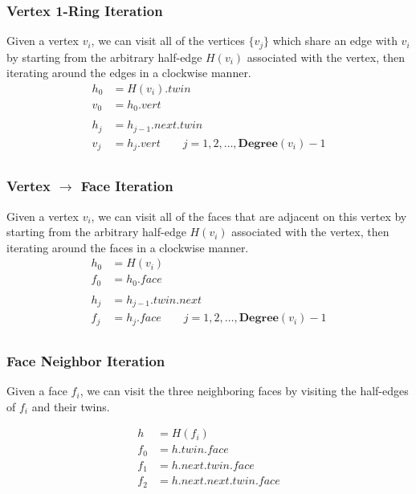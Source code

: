 \documentclass{article}
\begin{document}
\subsubsection{Vertex 1-Ring Iteration}
Given a vertex $v_i$, we can visit all of the vertices $\{v_j\}$ which share an edge with $v_i$ by starting from the arbitrary half-edge $H(v_i)$ associated with the vertex, then iterating around the edges in a clockwise manner.
\begin{equation}
\begin{aligned}
h_0 &= H(v_i).twin \\
v_0 &= h_0.vert \\
\\
h_j &= h_{j-1}.next.twin \\
v_j &= h_j.vert  \qquad j = 1, 2, \dots, \mathbf{Degree}(v_i)-1 \\
\end{aligned} \label{eq:VertexRingIteration}
\end{equation}

\subsubsection{Vertex $\to$ Face Iteration}
Given a vertex $v_i$, we can visit all of the faces that are adjacent on this vertex by starting from the arbitrary half-edge $H(v_i)$ associated with the vertex, then iterating around the faces in a clockwise manner.
\begin{equation}
\begin{aligned}
h_0 &= H(v_i) \\
f_0 &= h_0.face \\
\\
h_j &= h_{j-1}.twin.next \\
f_j &= h_j.face  \qquad j = 1, 2, \dots, \mathbf{Degree}(v_i)-1 \\
\end{aligned} \label{eq:VertFaceIteration}
\end{equation}

\subsubsection{Face Neighbor Iteration}
Given a face $f_i$, we can visit the three neighboring faces by visiting the half-edges of $f_i$ and their twins.

\begin{equation}
\begin{aligned}
h &= H(f_i) \\
f_0 &= h.twin.face \\
f_1 &= h.next.twin.face \\
f_2 &= h.next.next.twin.face \\
\end{aligned} \label{eq:VertFaceIteration}
\end{equation}
\end{document}
